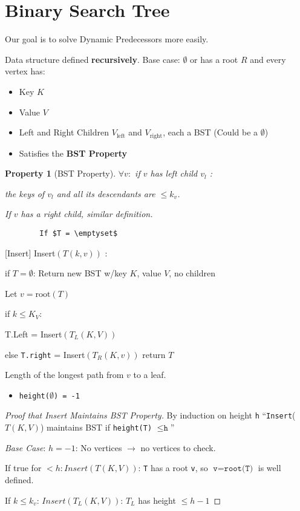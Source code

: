 \documentclass[11pt]{scrartcl}
\theoremstyle{dotlessP}
\newtheorem{property}[theorem]{Property}
\theoremstyle{dotlessN}
\begin{document}
\section{Binary Search Tree}
Our goal is to solve Dynamic Predecessors more easily.
\begin{definition}
	Data structure defined \textbf{recursively}. Base case: $\emptyset$ or has a root $R$ and every vertex has:
	\begin{itemize}
		\item Key $K$ 
		\item Value $V$ 
		\item Left and Right Children $V_\text{left}$ and  $V_\text{right}$, each a BST (Could be a $\emptyset$)	
		\item Satisfies the \textbf{BST Property}
	\end{itemize}
\end{definition}
\begin{property}
	[BST Property]	
	$\forall v:$ if $v$ has left child $v_l$ : 

	the keys of $v_l$ and all its descendants are $\leq k_v$.

	If $v$ has a right child, similar definition.
\end{property}
\begin{algorithm}
	\begin{verbatim}
		If $T = \emptyset$	
	\end{verbatim}
	[Insert]
	Insert$(T(k,v))$ :

	if $T = \emptyset$: Return new BST w/key $K$, value $V$, no children

	Let $v = \text{root}(T)$

	if  $k \leq K_V$:
	
	T.Left = Insert$(T_L(K,V))$
	
	else \texttt{T.right} = Insert$(T_R(K,v))$
	return  $T$
\end{algorithm}
\begin{definition}
	[Height $h$]
	Length of the longest path from $v$ to a leaf.
	\begin{itemize}
		\item \texttt{height($\emptyset$) = -1}
	\end{itemize}
\end{definition}
\begin{proof}
	[Proof that Insert Maintains BST Property]
By induction on height \texttt{h} ``\texttt{Insert}($T(K,V)$) maintains BST if \texttt{height(T)} $\leq \texttt{h}$''

	\textit{Base Case}: $h = -1$: No vertices  $\to$ no vertices to check.

	If true for $< h: Insert (T(K,V))$:  \texttt{T} has a root  \texttt{v}, so  $\texttt{v} = \texttt{root(T)}$ is well defined.

	If $k \leq k_v$:  $Insert(T_L(K,V))$:  $T_L$ has height $\leq h-1$
\end{proof}
\end{document}
